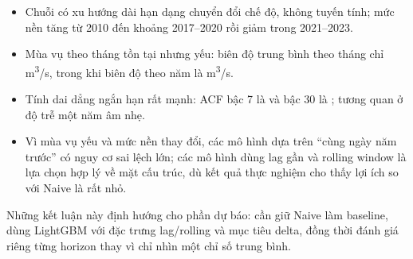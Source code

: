 \begin{itemize}[leftmargin=1.4em]
  \item Chuỗi có xu hướng dài hạn dạng chuyển đổi chế độ, không tuyến tính; mức nền
  tăng từ 2010 đến khoảng 2017--2020 rồi giảm trong 2021--2023.
  \item Mùa vụ theo tháng tồn tại nhưng yếu: biên độ trung bình theo tháng chỉ
  \MonthlyAmplitude{} m\textsuperscript{3}/s, trong khi biên độ theo năm là
  \YearlyAmplitude{} m\textsuperscript{3}/s.
  \item Tính dai dẳng ngắn hạn rất mạnh: ACF bậc 7 là \AcfSeven{} và bậc 30 là
  \AcfThirty{}; tương quan ở độ trễ một năm âm nhẹ.
  \item Vì mùa vụ yếu và mức nền thay đổi, các mô hình dựa trên “cùng ngày năm
  trước” có nguy cơ sai lệch lớn; các mô hình dùng lag gần và rolling window là
  lựa chọn hợp lý về mặt cấu trúc, dù kết quả thực nghiệm cho thấy lợi ích so với
  Naive là rất nhỏ.
\end{itemize}

Những kết luận này định hướng cho phần dự báo: cần giữ Naive làm baseline, dùng
LightGBM với đặc trưng lag/rolling và mục tiêu delta, đồng thời đánh giá riêng từng
horizon thay vì chỉ nhìn một chỉ số trung bình.
